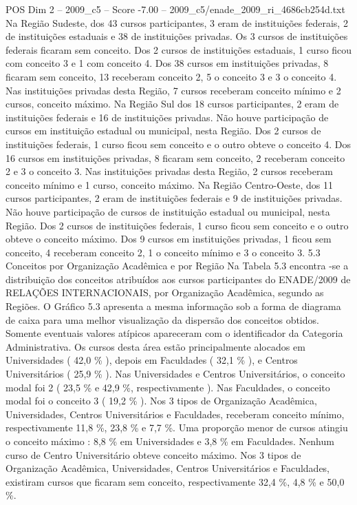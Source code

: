 \begin{textsample}{POS Dim 2 – 2009\_c5 – Score -7.00 – 2009\_c5/enade\_2009\_ri\_4686cb254d.txt}
Na Região Sudeste, dos 43 cursos participantes, 3 eram de instituições federais, 2 de instituições estaduais e 38 de instituições privadas.
Os 3 cursos de instituições federais ficaram sem conceito.
Dos 2 cursos de instituições estaduais, 1 curso ficou com conceito 3 e 1 com conceito 4.
Dos 38 cursos em instituições privadas, 8 ficaram sem conceito, 13 receberam conceito 2, 5 o conceito 3 e 3 o conceito 4.
Nas instituições privadas desta Região, 7 cursos receberam conceito mínimo e 2 cursos, conceito máximo.
Na Região Sul dos 18 cursos participantes, 2 eram de instituições federais e 16 de instituições privadas.
Não houve participação de cursos em instituição estadual ou municipal, nesta Região.
Dos 2 cursos de instituições federais, 1 curso ficou sem conceito e o outro obteve o conceito 4.
Dos 16 cursos em instituições privadas, 8 ficaram sem conceito, 2 receberam conceito 2 e 3 o conceito 3.
Nas instituições privadas desta Região, 2 cursos receberam conceito mínimo e 1 curso, conceito máximo.
Na Região Centro-Oeste, dos 11 cursos participantes, 2 eram de instituições federais e 9 de instituições privadas.
Não houve participação de cursos de instituição estadual ou municipal, nesta Região.
Dos 2 cursos de instituições federais, 1 curso ficou sem conceito e o outro obteve o conceito máximo.
Dos 9 cursos em instituições privadas, 1 ficou sem conceito, 4 receberam conceito 2, 1 o conceito mínimo e 3 o conceito 3. 5.3 Conceitos por Organização Acadêmica e por Região Na Tabela 5.3 encontra -se a distribuição dos conceitos atribuídos aos cursos participantes do ENADE/2009 de RELAÇÕES INTERNACIONAIS, por Organização Acadêmica, segundo as Regiões.
O Gráfico 5.3 apresenta a mesma informação sob a forma de diagrama de caixa para uma melhor visualização da dispersão dos conceitos obtidos.
Somente eventuais valores atípicos apareceram com o identificador da Categoria Administrativa.
Os cursos desta área estão principalmente alocados em Universidades ( 42,0 \% ), depois em Faculdades ( 32,1 \% ), e Centros Universitários ( 25,9 \% ).
Nas Universidades e Centros Universitários, o conceito modal foi 2 ( 23,5 \% e 42,9 \%, respectivamente ).
Nas Faculdades, o conceito modal foi o conceito 3 ( 19,2 \% ).
Nos 3 tipos de Organização Acadêmica, Universidades, Centros Universitários e Faculdades, receberam conceito mínimo, respectivamente 11,8 \%, 23,8 \% e 7,7 \%.
Uma proporção menor de cursos atingiu o conceito máximo : 8,8 \% em Universidades e 3,8 \% em Faculdades.
Nenhum curso de Centro Universitário obteve conceito máximo.
Nos 3 tipos de Organização Acadêmica, Universidades, Centros Universitários e Faculdades, existiram cursos que ficaram sem conceito, respectivamente 32,4 \%, 4,8 \% e 50,0 \%.

\end{textsample}
